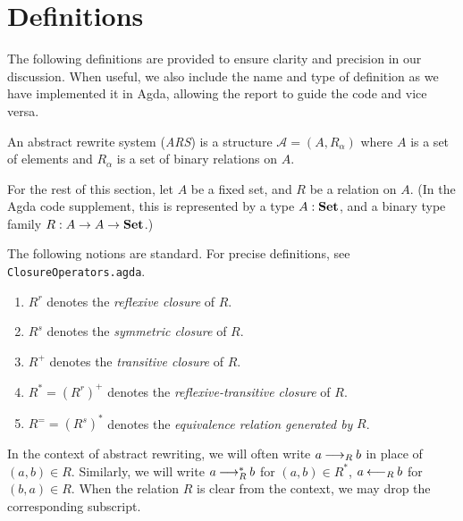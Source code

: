 \section{Definitions}
\label{sec:Definitions}
The following definitions are provided to ensure clarity and precision
in our discussion.
 When useful, we also include the name and type of
definition as we have implemented it in Agda, allowing the report to guide the code
and vice versa.



\begin{definition}
    An abstract rewrite system (\emph{ARS}) is a structure $\mathcal{A} = (A, R_\alpha)$ where
     $A$ is a set of elements and $R_\alpha$ is a set of binary relations on $A$.
\end{definition}

For the rest of this section, let $A$ be a fixed set, and $R$ be a relation on $A$.
(In the Agda code supplement, this is represented by a type $A : \mathbf{Set}$,
and a binary type family $R : A \to A \to \mathbf{Set}$.)



\begin{notation}
  The following notions are standard.  For precise definitions,
  see \texttt{ClosureOperators.agda}.
  \begin{enumerate}
    \item $R^r$ denotes the \emph{reflexive closure} of $R$.
    \item $R^s$ denotes the \emph{symmetric closure} of $R$.
    \item $R^+$ denotes the \emph{transitive closure} of $R$.
    \item $R^* = (R^r)^+$ denotes the \emph{reflexive-transitive closure} of $R$.
    \item $R^= = (R^s)^*$ denotes the \emph{equivalence relation generated by} $R$.
  \end{enumerate}
\end{notation}




In the context of abstract rewriting, we will often write $a \mathbin{\longrightarrow_R} b$
in place of $(a,b) \in R$.  Similarly, we will write $a \mathbin{\longrightarrow_R^*} b$ for $(a,b) \in R^*$,
$a \mathbin{\longleftarrow_R} b$ for $(b,a) \in R$.  When the relation $R$ is clear from the context,
we may drop the corresponding subscript.

